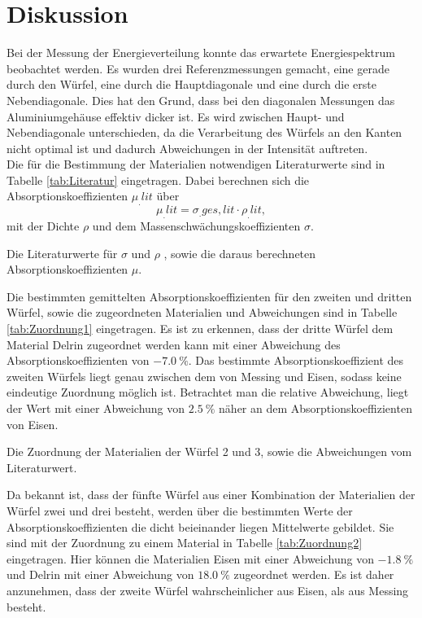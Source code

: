 
\section{Diskussion}
\label{sec:Diskussion}

Bei der Messung der Energieverteilung konnte das erwartete Energiespektrum beobachtet werden.
Es wurden drei Referenzmessungen gemacht, eine gerade durch den Würfel, eine durch die Hauptdiagonale und eine durch die erste Nebendiagonale. Dies hat den Grund, dass bei den diagonalen Messungen das Aluminiumgehäuse effektiv dicker ist. Es wird zwischen Haupt- und Nebendiagonale unterschieden, da die Verarbeitung des Würfels an den Kanten nicht optimal ist und dadurch Abweichungen in der Intensität auftreten.\\
\newpage
\noindent Die für die Bestimmung der Materialien notwendigen Literaturwerte sind in Tabelle \ref{tab:Literatur} eingetragen.
Dabei berechnen sich die Absorptionskoeffizienten $\mu_.{lit}$ über
\[
\mu_.{lit} = \sigma_.{ges,lit}\cdot\rho_.{lit},
\]
mit der Dichte $\rho$ und dem Massenschwächungskoeffizienten $\sigma$.

\begin{table}
	\centering
	\caption{Die Literaturwerte für $\sigma$ \cite{absorptionskoeffizienten} und $\rho$ \cite{dichten}, sowie die daraus berechneten Absorptionskoeffizienten $\mu$.}
	
	\label{tab:Literatur}
\end{table}

\noindent Die bestimmten gemittelten Absorptionskoeffizienten für den zweiten und dritten Würfel, sowie die zugeordneten Materialien und Abweichungen sind in Tabelle \ref{tab:Zuordnung1} eingetragen. Es ist zu erkennen, dass der dritte Würfel dem Material Delrin zugeordnet werden kann mit einer Abweichung des Absorptionskoeffizienten von $\SI{-7.0}{\%}$. Das bestimmte Absorptionskoeffizient des zweiten Würfels liegt genau zwischen dem von Messing und Eisen, sodass keine eindeutige Zuordnung möglich ist. Betrachtet man die relative Abweichung, liegt der Wert mit einer Abweichung von $\SI{2.5}{\%}$ näher an dem Absorptionskoeffizienten von Eisen.

\begin{table}
	\centering
	\caption{Die Zuordnung der Materialien der Würfel 2 und 3, sowie die Abweichungen vom Literaturwert.}
	
	\label{tab:Zuordnung1}
\end{table}

\noindent Da bekannt ist, dass der fünfte Würfel aus einer Kombination der Materialien der Würfel zwei und drei besteht, werden über die bestimmten Werte der Absorptionskoeffizienten die dicht beieinander liegen Mittelwerte gebildet. Sie sind mit der Zuordnung zu einem Material in Tabelle \ref{tab:Zuordnung2} eingetragen. Hier können die Materialien Eisen mit einer Abweichung von $\SI{-1.8}{\%}$ und Delrin mit einer Abweichung von $\SI{18.0}{\%}$ zugeordnet werden. Es ist daher anzunehmen, dass der zweite Würfel wahrscheinlicher aus Eisen, als aus Messing besteht. 

